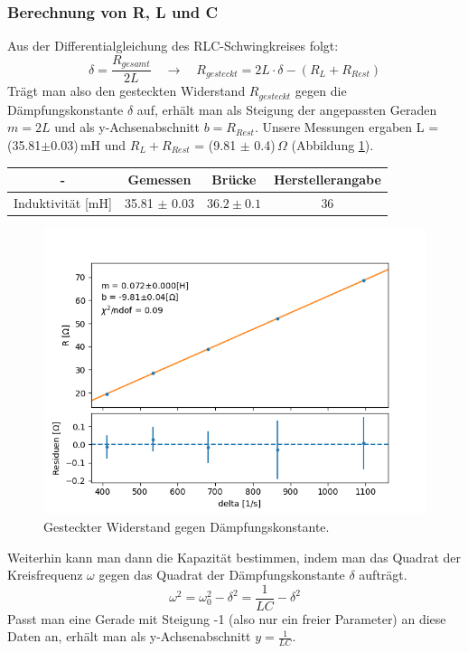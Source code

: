 \documentclass[12pt,a4paper]{article}
\begin{document}
\subsubsection{Berechnung von R, L und C}
Aus der Differentialgleichung des RLC-Schwingkreises folgt:
\begin{equation}
\delta = \frac{R_{gesamt}}{2L} \quad \rightarrow \quad R_{gesteckt} = 2 L \cdot \delta - (R_L + R_{Rest})
\end{equation}
Trägt man also den gesteckten Widerstand $R_{gesteckt}$ gegen die Dämpfungskonstante $\delta$ auf, erhält man als Steigung der angepassten Geraden $m = 2L$ und als y-Achsenabschnitt $b = R_{Rest}$. Unsere Messungen ergaben L = (35.81$\pm$0.03)\,mH und $R_L + R_{Rest}$ = (9.81 $\pm$ 0.4)\,$\Omega$ (Abbildung \ref{pic:fit_L_RLC}).

\begin{table}[H]
	\centering
	\begin{tabular}{|c|c|c|c|}
		\hline
		- & \textbf{Gemessen} & \textbf{Brücke} & \textbf{Herstellerangabe} \\
		\hline
		Induktivität [mH] & 35.81 $\pm$ 0.03 & $36.2 \pm 0.1$ & 36 \\
		\hline
	\end{tabular}
\end{table}

\begin{figure}
	\centering
	\includegraphics[width=0.8\linewidth]{Bilder/fit_L_RLC}
	\caption{Gesteckter Widerstand gegen Dämpfungskonstante.}
	\label{pic:fit_L_RLC}
\end{figure}

Weiterhin kann man dann die Kapazität bestimmen, indem man das Quadrat der Kreisfrequenz $\omega$ gegen das Quadrat der Dämpfungskonstante $\delta$ aufträgt.
\begin{equation}
\omega^2 = \omega_0^2 -\delta^2 = \frac{1}{LC} - \delta^2
\end{equation}
Passt man eine Gerade mit Steigung -1 (also nur ein freier Parameter) an diese Daten an, erhält man als y-Achsenabschnitt $y = \frac{1}{LC}$.
\end{document}
